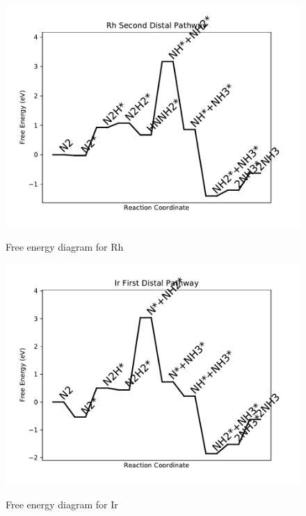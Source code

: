 \documentclass{article}
\begin{document}
\newpage
\begin{figure}
\includegraphics[width=1\linewidth]{data/plots/Rh_distal_2.pdf}
\label{fig:Rh_distal_2}
\caption{Free energy diagram for Rh}
\end{figure}

\begin{figure}
\includegraphics[width=1\linewidth]{data/plots/Ir_distal_1.pdf}
\label{fig:Ir_distal_1}
\caption{Free energy diagram for Ir}
\end{figure}
\end{document}
